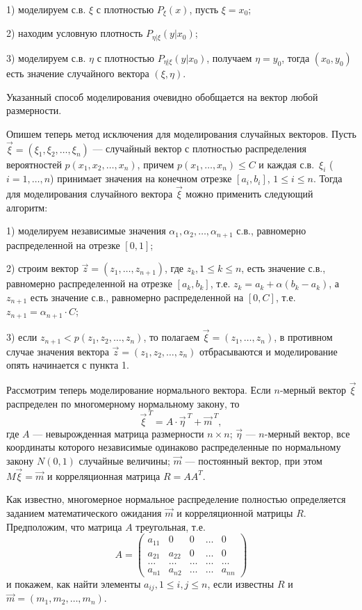 \documentclass[bachelor, och, pract3]{SCWorks}
\begin{document}
1) моделируем с.в. \(\xi\) с плотностью \(P_\xi(x)\), пусть \(\xi = x_0\);

2) находим условную плотность \(P_{\eta|\xi}(y|x_0)\);

3) моделируем с.в. $\eta$ с плотностью \(P_{\eta|\xi}(y|x_0)\), получаем \(\eta = y_0\), тогда \((x_0, y_0)\) есть значение случайного вектора \((\xi, \eta)\).

Указанный способ моделирования очевидно обобщается на вектор любой размерности.

Опишем теперь метод исключения для моделирования случайных векторов. Пусть \(\vec{\xi} = (\xi_1, \xi_2, \dots, \xi_n)\) --- случайный вектор с плотностью распределения вероятностей \(p(x_1, x_2, \dots, x_n)\), причем \(p(x_1, \dots, x_n) \le C\) и каждая с.в.~\(\xi_i\) (\(i=1, \dots, n\)) принимает значения на конечном отрезке \([a_i, b_i]\), \(1 \le i \le n\). Тогда для моделирования случайного вектора \(\vec{\xi}\) можно применить следующий алгоритм:

1) моделируем независимые значения \(\alpha_1, \alpha_2, \dots, \alpha_{n+1}\) с.в., равномерно распределенной на отрезке \([0,1]\);

2) строим вектор \(\vec{z} = (z_1, \dots, z_{n+1})\), где \(z_k, 1 \le k \le n\), есть значение с.в.,  равномерно распределенной на отрезке \([a_k, b_k]\), т.е. \(z_k = a_k + \alpha(b_k - a_k)\), а \(z_{n+1}\) есть значение с.в., равномерно распределенной на \([0, C]\), т.е. $z_{n+1} = \alpha_{n+1}\cdot C$;

3) если \(z_{n+1} < p(z_1, z_2, \dots, z_n)\), то полагаем \(\vec{\xi} = (z_1, \dots, z_n)\), в противном случае значения вектора \(\vec{z} = (z_1, z_2, \dots, z_n)\) отбрасываются и моделирование опять начинается с пункта 1.

Рассмотрим теперь моделирование нормального вектора. Если \(n\)-мер\-ный вектор \(\vec{\xi}\) распределен по многомерному нормальному закону, то \[\vec{\xi}^{~T} = A \cdot \vec{\eta}^{~T} + \vec{m}^{~T},\] где \(A\) --- невырожденная матрица размерности \(n \times n\); \(\vec{\eta}\) --- \(n\)-мерный вектор, все координаты которого независимые одинаково распределенные по нормальному закону \(N(0,1)\) случайные величины; \(\vec{m}\) --- постоянный вектор, при этом \(M\vec{\xi} = \vec{m}\) и корреляционная матрица \(R = AA^T\).

Как известно, многомерное нормальное распределение полностью определяется заданием математического ожидания \(\vec{m}\) и корреляционной матрицы \(R\). Предположим, что матрица \(A\) треугольная, т.е.
\[ A = \begin{pmatrix} 
a_{11} & 0 & 0 & \dots & 0 \\ 
a_{21} & a_{22} & 0 & \dots & 0 \\ 
\dots & \dots & \dots & \dots & \dots \\ 
a_{n1} & a_{n2} & \dots & \dots & a_{nn} 
\end{pmatrix} \]
и покажем, как найти элементы \(a_{ij}, 1 \le i,j \le n\), если известны $R$ и \(\vec{m} = (m_1, m_2, \dots, m_n)\).
\end{document}
